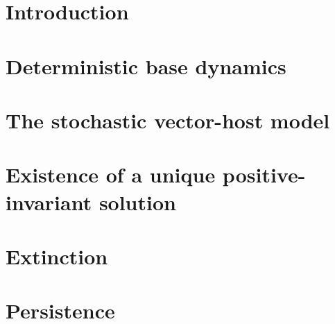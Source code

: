 \documentclass[3p,sort&compress,times]{elsarticle}
\theoremstyle{plain}
\theoremstyle{definition}
\begin{document}
    
    \section{Introduction}
    \section{Deterministic base dynamics}
        
    \section{The stochastic vector-host model}
        
    \section{Existence of a unique positive-invariant solution}
        
    \section{Extinction}
        
    \section{Persistence}
        
%
    
    
\end{document}
